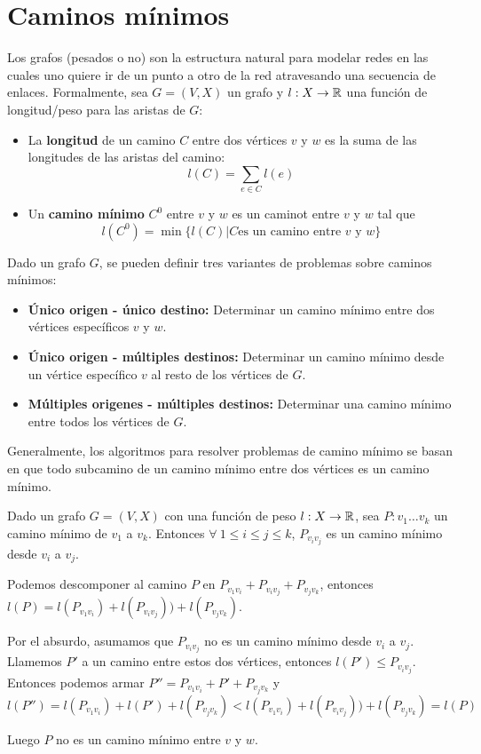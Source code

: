 \section{Caminos mínimos}
Los grafos (pesados o no) son la estructura natural para modelar redes en las cuales uno quiere ir de un punto a otro de la red atravesando una secuencia de enlaces. Formalmente, sea \(G = (V, X)\) un grafo y \(l: X \to \mathbb{R}\) una función de longitud/peso para las aristas de \(G\):

\begin{itemize}
  \item La \textbf{longitud} de un camino \(C\) entre dos vértices \(v\) y \(w\) es la suma de las longitudes de las aristas del camino:
        \[l(C) = \sum_{e\in C}l(e)\]
  \item Un \textbf{camino mínimo} \(C^0\) entre \(v\) y \(w\) es un caminot entre \(v\) y \(w\) tal que \[l(C^0)=\min\{l(C) | C \text{es un camino entre } v \text{ y } w\}\]
\end{itemize}

Dado un grafo \(G\), se pueden definir tres variantes de problemas sobre caminos mínimos:\
\begin{itemize}
  \item \textbf{Único origen - único destino:} Determinar un camino mínimo entre dos vértices específicos \(v\) y \(w\).
  \item \textbf{Único origen - múltiples destinos:} Determinar un camino mínimo desde un vértice específico \(v\) al resto de los vértices de \(G\).
  \item \textbf{Múltiples origenes - múltiples destinos:} Determinar una camino mínimo entre todos los vértices de \(G\).
\end{itemize}

Generalmente, los algoritmos para resolver problemas de camino mínimo se basan en que todo subcamino de un camino mínimo entre dos vértices es un camino mínimo.

\begin{proposicion}
  Dado un grafo \(G = (V, X)\) con una función de peso \(l: X \to \mathbb{R}\), sea \(P: v_1\dots v_k\) un camino mínimo de \(v_1\) a \(v_k\). Entonces \(\forall~1\leq i \leq j \leq k\), \(P_{v_iv_j}\) es un camino mínimo desde \(v_i\) a \(v_j\).
\end{proposicion}
\begin{demo}
  Podemos descomponer al camino \(P\) en \(P_{v_1v_i} + P_{v_iv_j} + P_{v_jv_k}\), entonces \(l(P) = l(P_{v_1v_i}) + l(P_{v_iv_j})) + l(P_{v_jv_k})\).

  Por el absurdo, asumamos que \(P_{v_iv_j}\) no es un camino mínimo desde \(v_i\) a \(v_j\). Llamemos \(P'\) a un camino entre estos dos vértices, entonces \(l(P') \leq P_{v_iv_j}\). Entonces podemos armar \(P'' = P_{v_1v_i} + P' + P_{v_jv_k}\) y
  \[l(P'') = l(P_{v_1v_i}) + l(P') + l(P_{v_jv_k}) < l(P_{v_1v_i}) + l(P_{v_iv_j})) + l(P_{v_jv_k}) = l(P)\]

  Luego \(P\) no es un camino mínimo entre \(v\) y \(w\).
\end{demo}

